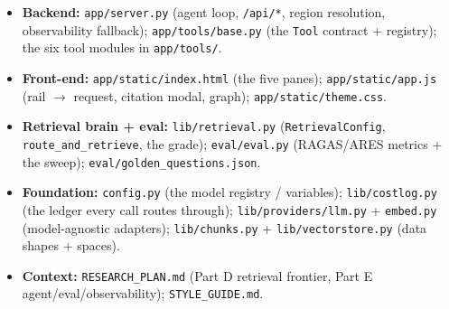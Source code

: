 \documentclass[11pt]{article}
\newcommand{\code}[1]{\texttt{#1}}
\begin{document}
\begin{itemize}[leftmargin=1.4em]
  \item \textbf{Backend:} \code{app/server.py} (agent loop, \code{/api/*}, region
        resolution, observability fallback); \code{app/tools/base.py} (the
        \code{Tool} contract + registry); the six tool modules in
        \code{app/tools/}.
  \item \textbf{Front-end:} \code{app/static/index.html} (the five panes);
        \code{app/static/app.js} (rail $\to$ request, citation modal, graph);
        \code{app/static/theme.css}.
  \item \textbf{Retrieval brain + eval:} \code{lib/retrieval.py}
        (\code{RetrievalConfig}, \code{route\_and\_retrieve}, the grade);
        \code{eval/eval.py} (RAGAS/ARES metrics + the sweep);
        \code{eval/golden\_questions.json}.
  \item \textbf{Foundation:} \code{config.py} (the model registry / variables);
        \code{lib/costlog.py} (the ledger every call routes through);
        \code{lib/providers/llm.py} + \code{embed.py} (model-agnostic adapters);
        \code{lib/chunks.py} + \code{lib/vectorstore.py} (data shapes + spaces).
  \item \textbf{Context:} \code{RESEARCH\_PLAN.md} (Part D retrieval frontier,
        Part E agent/eval/observability); \code{STYLE\_GUIDE.md}.
\end{itemize}
\end{document}
